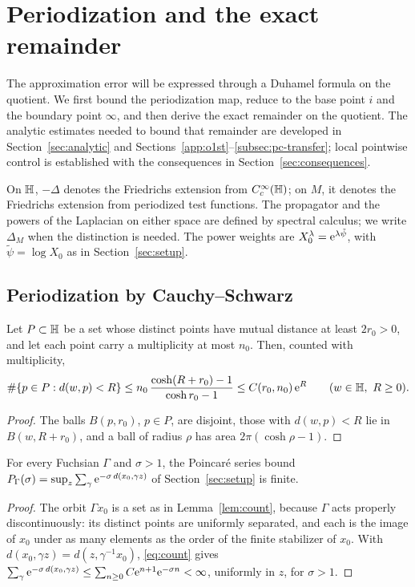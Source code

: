 \section{Periodization and the exact remainder}\label{sec:remainder}
The approximation error will be expressed through a Duhamel formula on the quotient. We first bound the periodization
map, reduce to the base point $i$ and the boundary point $\infty$, and then derive the exact remainder on the quotient.
The analytic estimates needed to bound that remainder are developed in Section~\ref{sec:analytic} and Sections~\ref{app:o1st}--\ref{subsec:pc-transfer};
local pointwise control is established with the consequences in Section~\ref{sec:consequences}.

On $\mathbb{H}$, $-\Delta$ denotes the Friedrichs extension from $C_c^\infty(\mathbb{H})$; on $M$, it denotes the
Friedrichs extension from periodized test functions. The propagator and the powers of the Laplacian on either space
are defined by spectral calculus; we write $\Delta_M$ when the distinction is needed.
The power weights are $X_0^\lambda=\mathrm{e}^{\lambda\tilde\psi}$, with $\tilde\psi=\log X_0$ as in Section~\ref{sec:setup}.

\subsection{Periodization by Cauchy--Schwarz}\label{sec:t2}

\begin{lemma}\label{lem:count}
Let $P\subset\mathbb{H}$ be a set whose distinct points have mutual distance at least $2r_0>0$, and let each point carry a
multiplicity at most $n_0$. Then, counted with multiplicity,
\begin{equation}\label{eq:count}
\#\{p\in P:d(w,p)<R\}\le n_0\,\frac{\cosh(R+r_0)-1}{\cosh r_0-1}\le C(r_0,n_0)\,\mathrm{e}^{R}\qquad(w\in\mathbb{H},\ R\ge0).
\end{equation}
\end{lemma}
\begin{proof}
The balls $B(p,r_0)$, $p\in P$, are disjoint, those with $d(w,p)<R$ lie in $B(w,R+r_0)$, and a ball of radius $\rho$ has
area $2\pi(\cosh\rho-1)$.
\end{proof}

\begin{lemma}\label{lem:p1}
For every Fuchsian $\Gamma$ and $\sigma>1$, the Poincar\'e series bound $P_\Gamma(\sigma)=\sup_{z}\sum_{\gamma}\mathrm{e}^{-\sigma\,d(x_0,\gamma z)}$ of
Section~\ref{sec:setup} is finite.
\end{lemma}
\begin{proof}
The orbit $\Gamma x_0$ is a set as in Lemma~\ref{lem:count}, because $\Gamma$ acts properly discontinuously: its distinct points are uniformly
separated, and each is the image of $x_0$ under as many elements as the order of the finite stabilizer of $x_0$. With
$d(x_0,\gamma z)=d(z,\gamma^{-1}x_0)$, \eqref{eq:count} gives
$\sum_\gamma\mathrm{e}^{-\sigma\,d(x_0,\gamma z)}\le\sum_{n\ge0}C\mathrm{e}^{n+1}\mathrm{e}^{-\sigma n}<\infty$, uniformly in $z$, for $\sigma>1$.
\end{proof}

